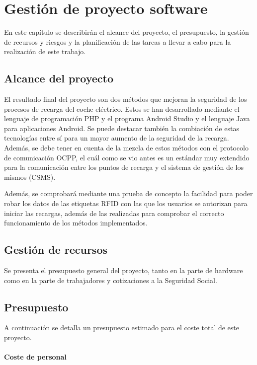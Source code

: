 \documentclass[12pt,a4paper,onecolumn,oneside]{report}
\begin{document}
\chapter{Gestión de proyecto software}
\label{Gestión de proyecto software}

En este capítulo se describirán el alcance del proyecto, el presupuesto, la gestión de recursos y riesgos  y la planificación de las tareas a llevar a cabo para la realización de este trabajo.


\section{Alcance del proyecto}
\label{Alcance del proyecto}

El resultado final del proyecto son dos métodos que mejoran la seguridad de los procesos de recarga del coche eléctrico. Estos se han desarrollado mediante el lenguaje de programación PHP y el programa Android Studio y el lenguaje Java para aplicaciones Android. Se puede destacar también la combiación de estas tecnologías entre sí para un mayor aumento de la seguridad de la recarga. Además, se debe tener en cuenta de la mezcla de estos métodos con el protocolo de comunicación OCPP, el cuál como se vio antes es un estándar muy extendido para la comunicación entre los puntos de recarga y el sistema de gestión de los mismos (CSMS).

Además, se comprobará mediante una prueba de concepto la facilidad para poder robar los datos de las etiquetas RFID con las que los usuarios se autorizan para iniciar las recargas, además de las realizadas para comprobar el correcto funcionamiento de los métodos implementados.



\section{Gestión de recursos}

Se presenta el presupuesto general del proyecto, tanto en la parte de hardware como en la parte de trabajadores y cotizaciones a la Seguridad Social.

\section{Presupuesto}

A continuación se detalla un presupuesto estimado para el coste total de este proyecto.

\subsubsection{Coste de personal}
\end{document}
